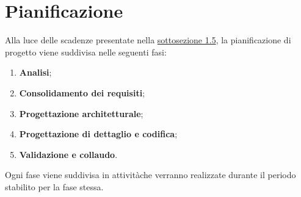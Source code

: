 \section{Pianificazione}
Alla luce delle scadenze presentate nella \hyperlink{scadenze}{sottosezione 1.5}, la pianificazione di progetto viene suddivisa nelle seguenti fasi:
\begin{enumerate}
	\item \textbf{Analisi};
	\item \textbf{Consolidamento dei requisiti};
	\item \textbf{Progettazione architetturale};
	\item \textbf{Progettazione di dettaglio e codifica};
	\item \textbf{Validazione e collaudo}.
\end{enumerate}
Ogni fase viene suddivisa in attività\glosp che verranno realizzate durante il 
periodo stabilito per la fase stessa. 
